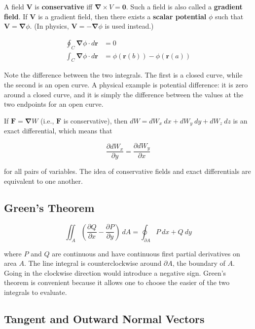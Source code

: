 A field $\mathbf{V}$ is \textbf{conservative} iff $\bm{\nabla} \times V = \mathbf{0}$. Such a field is also called a \textbf{gradient field}. If $\mathbf{V}$ is a gradient field, then there exists a \textbf{scalar potential} $\phi$ such that $\mathbf{V} = \bm{\nabla}\phi$. (In physics, $\mathbf{V} = -\bm{\nabla}\phi$ is used instead.)

\begin{align*}
    \oint_C \bm{\nabla}\phi \cdot d\mathbf{r} & = 0                                         \\
    \int_C \bm{\nabla}\phi \cdot d\mathbf{r}  & = \phi(\mathbf{r}(b)) - \phi(\mathbf{r}(a))
\end{align*}

Note the difference between the two integrals. The first is a closed curve, while the second is an open curve. A physical example is potential difference: it is zero around a closed curve, and it is simply the difference between the values at the two endpoints for an open curve.

If $\mathbf{F} = \bm{\nabla} W$ (i.e., $\mathbf{F}$ is conservative), then $dW = dW_x~dx + dW_y~dy + dW_z~dz$ is an exact differential, which means that

\begin{equation*}
    \frac{\partial dW_x}{\partial y} = \frac{\partial dW_y}{\partial x}
\end{equation*}

for all pairs of variables. The idea of conservative fields and exact differentials are equivalent to one another.

\subsection{Green's Theorem}

\begin{equation*}
    \iint_A \left(\frac{\partial Q}{\partial x} - \frac{\partial P}{\partial y}\right)~dA = \oint_{\partial A} P~dx + Q~dy
\end{equation*}

where $P$ and $Q$ are continuous and have continuous first partial derivatives on area $A$. The line integral is counterclockwise around $\partial A$, the boundary of $A$. Going in the clockwise direction would introduce a negative sign. Green's theorem is convenient because it allows one to choose the easier of the two integrals to evaluate.

\subsection{Tangent and Outward Normal Vectors}

